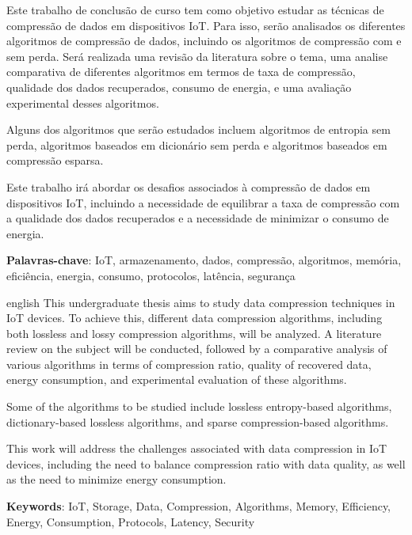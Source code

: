 \documentclass{TCC_UP}
\begin{document}
    \setlength{\absparsep}{18pt}
    \begin{resumo}
      Este trabalho de conclusão de curso tem como objetivo estudar as técnicas de compressão de dados em dispositivos IoT. Para isso, serão analisados os diferentes algoritmos de compressão de dados, incluindo os algoritmos de compressão com e sem perda. Será realizada uma revisão da literatura sobre o tema, uma analise comparativa de diferentes algoritmos em termos de taxa de compressão, qualidade dos dados recuperados, consumo de energia, e uma avaliação experimental desses algoritmos.

      Alguns dos algoritmos que serão estudados incluem algoritmos de entropia sem perda, algoritmos baseados em dicionário sem perda e algoritmos baseados em compressão esparsa.

      Este trabalho irá abordar os desafios associados à compressão de dados em dispositivos IoT, incluindo a necessidade de equilibrar a taxa de compressão com a qualidade dos dados recuperados e a necessidade de minimizar o consumo de energia.

    \textbf{Palavras-chave}: IoT, armazenamento, dados, compressão, algoritmos, memória, eficiência, energia, consumo, protocolos, latência, segurança
    \end{resumo}

    \begin{resumo}[Abstract]
     \begin{otherlanguage*}{english}
This undergraduate thesis aims to study data compression techniques in IoT devices. To achieve this, different data compression algorithms, including both lossless and lossy compression algorithms, will be analyzed. A literature review on the subject will be conducted, followed by a comparative analysis of various algorithms in terms of compression ratio, quality of recovered data, energy consumption, and experimental evaluation of these algorithms.

Some of the algorithms to be studied include lossless entropy-based algorithms, dictionary-based lossless algorithms, and sparse compression-based algorithms.

This work will address the challenges associated with data compression in IoT devices, including the need to balance compression ratio with data quality, as well as the need to minimize energy consumption.

       \textbf{Keywords}: IoT, Storage, Data, Compression, Algorithms, Memory, Efficiency, Energy, Consumption, Protocols, Latency, Security
     \end{otherlanguage*}
    \end{resumo}
\end{document}
